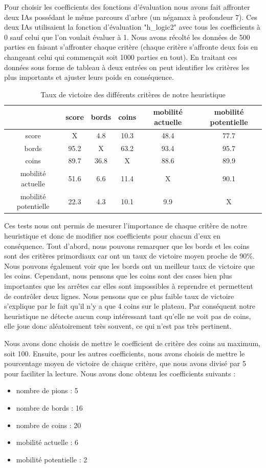 \documentclass[12pt]{article}
\begin{document}
Pour choisir les coefficients des fonctions d'évaluation nous avons fait affronter deux IAs possédant le même parcours d'arbre (un négamax à profondeur 7). Ces deux IAs utilisaient la fonction d'évaluation "h\_logic2" avec tous les coefficients à 0 sauf celui que l'on voulait évaluer à 1. Nous avons récolté les données de 500 parties en faisant s'affronter chaque critère (chaque critère s'affronte deux fois en changeant celui qui commençait soit 1000 parties en tout). En traitant ces données sous forme de tableau à deux entrées on peut identifier les critères les plus importants et ajuster leurs poids en conséquence.

\begin{table}[H]
\centering
\caption{Taux de victoire des différents critères de notre heuristique}
\begin{tabular}{c|ccccc}
         	   & score & bords & coins & mobilité actuelle & mobilité potentielle \\
\hline
       score    			&		X			&	4.8	    &   10.3    &  48.4	 &	 77.7    \\
       bords     		  	&		95.2		&	X	    &   63.2    &  93.4	 &   95.7    \\
       coins    		  	&		89.7		&	36.8    &   X	    &  88.6	 &   89.9    \\
       mobilité actuelle    &		51.6		&	6.6	    &   11.4	&   X 	 & 	 90.1	 \\
       mobilité potentielle & 		22.3		&	4.3		&	10.1	&  9.9	 &	 X
\end{tabular}
\end{table}
Ces tests nous ont permis de mesurer l'importance de chaque critère de notre heuristique et donc de modifier nos coefficients pour chacun d'eux en conséquence. Tout d'abord, nous pouvons remarquer que les bords et les coins sont des critères primordiaux car ont un taux de victoire moyen proche de 90\%. Nous pouvons également voir que les bords ont un meilleur taux de victoire que les coins. Cependant, nous pensons que les coins sont des cases bien plus importantes que les arrêtes car elles sont impossibles à reprendre et permettent de contrôler deux lignes. Nous pensons que ce plus faible taux de victoire s'explique par le fait qu'il n'y a que 4 coins sur le plateau. Par conséquent notre heuristique ne détecte aucun coup intéressant tant qu'elle ne voit pas de coins, elle joue donc aléatoirement très souvent, ce qui n'est pas très pertinent. 

Nous avons donc choisis de mettre le coefficient de critère des coins au maximum, soit 100. Ensuite, pour les autres coefficients, nous avons choisis de mettre le pourcentage moyen de victoire de chaque critère, que nous avons divisé par 5 pour faciliter la lecture. Nous avons donc obtenu les coefficients suivants :
\begin{itemize}
\item nombre de pions : 5
\item nombre de bords : 16
\item nombre de coins : 20
\item mobilité actuelle : 6
\item mobilité potentielle : 2
\end{itemize}
\medbreak
\end{document}
